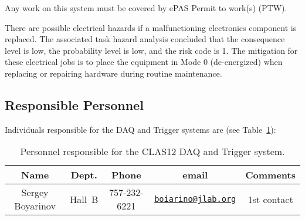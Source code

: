 Any work on this system must be covered by ePAS Permit to work(s) (PTW).

There are possible electrical hazards if a malfunctioning electronics component is replaced. 
The associated task hazard analysis concluded that the consequence level is low, the 
probability level is low, and the risk code is 1. The mitigation for these electrical jobs is 
to place the equipment in Mode 0 (de-energized) when replacing or repairing hardware during 
routine maintenance.

\subsection{Responsible Personnel}

Individuals responsible for the DAQ and Trigger systems are (see Table~\ref{tb:daq}):

\begin{table}[!htb]
\centering
\begin{tabular}{|c|c|c|c|c|} \hline
Name&Dept.&Phone&email&Comments \\ \hline
Sergey Boyarinov&Hall~B&757-232-6221&\href{mailto:boiarino@jlab.org}{\nolinkurl{boiarino@jlab.org}}&1st contact \\ \hline
 \end{tabular}
\caption{Personnel responsible for the CLAS12 DAQ and Trigger system.} 
\label{tb:daq}
\end{table}

